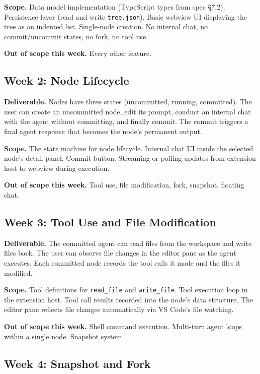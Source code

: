 \documentclass[11pt,letterpaper]{article}
\begin{document}
\textbf{Scope.} Data model implementation (TypeScript types from spec §7.2). Persistence layer (read and write \texttt{tree.json}). Basic webview UI displaying the tree as an indented list. Single-node creation. No internal chat, no commit/uncommit states, no fork, no tool use.

\textbf{Out of scope this week.} Every other feature.

\subsection*{Week 2: Node Lifecycle}

\textbf{Deliverable.} Nodes have three states (uncommitted, running, committed). The user can create an uncommitted node, edit its prompt, conduct an internal chat with the agent without committing, and finally commit. The commit triggers a final agent response that becomes the node's permanent output.

\textbf{Scope.} The state machine for node lifecycle. Internal chat UI inside the selected node's detail panel. Commit button. Streaming or polling updates from extension host to webview during execution.

\textbf{Out of scope this week.} Tool use, file modification, fork, snapshot, floating chat.

\subsection*{Week 3: Tool Use and File Modification}

\textbf{Deliverable.} The committed agent can read files from the workspace and write files back. The user can observe file changes in the editor pane as the agent executes. Each committed node records the tool calls it made and the files it modified.

\textbf{Scope.} Tool definitions for \texttt{read\_file} and \texttt{write\_file}. Tool execution loop in the extension host. Tool call results recorded into the node's data structure. The editor pane reflects file changes automatically via VS Code's file watching.

\textbf{Out of scope this week.} Shell command execution. Multi-turn agent loops within a single node. Snapshot system.

\subsection*{Week 4: Snapshot and Fork}
\end{document}
